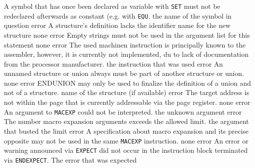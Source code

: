 \documentclass[12pt,twoside]{report}
\newcommand{\tty}[1]{{\tt #1}}
\begin{document}
\begin{description}
               {A symbol that has once been declared as variable with
                {\tt SET} must not be redeclared afterwards as constant
                (e.g. with {\tt EQU}.}
               {the name of the symbol in question}
               {error}
               {A structure's definition lacks the identifier name for the
                new structure}
               {none}
               {error}
               {Empty strings must not be used in the argument list for
                this statement}
               {none}
               {error}
               {The used machinen instruction is principally known
                to the assembler, however, it is currently not
                implemented, du to lack of documentation from the
                processor manufacturer.}
               {the instruction that was used}
               {error}
               {An unnamed structure or union always must be part
                of another structure or union.}
               {none}
               {error}
               {ENDUNION may only be used to finalize the definition
                of a union and not of a structure.}
               {name of the structure (if available)}
               {error}
               {The target address is not within the page
                that is currently addressable via the page
                register.}
               {none}
               {error}
               {An argument to \tty{MACEXP} could not be
                interpreted.}
               {the unknown argument}
               {error}
               {The number macro expansion arguments exceeds the allowed limit.}
               {the argument that busted the limit}
               {error}
               {A specification about macro expansion and its
                precise opposite may not be used in the same
                \tty{MACEXP} instruction.}
               {none}
               {error}
               {An error or warning announced via {\tt EXPECT} did not occur in the
                instruction block terminated via {\tt ENDEXPECT}.}
               {The error that was expected}

\end{description}
\end{document}
